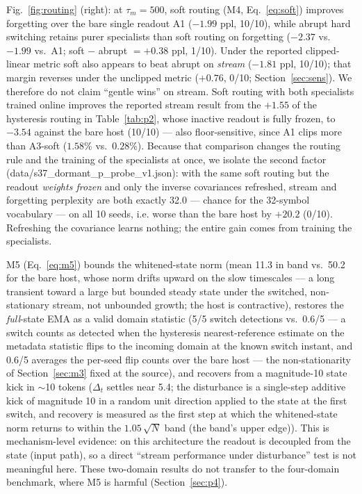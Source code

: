 \documentclass[preprint,12pt]{elsarticle}
\begin{document}
Fig.~\ref{fig:routing} (right): at $\tau_m{=}500$, soft routing (M4,
Eq.~\ref{eq:soft}) improves forgetting over the bare single readout A1
($-1.99$ ppl, 10/10), while abrupt hard switching retains purer
specialists than soft routing on forgetting ($-2.37$ vs.\ $-1.99$ vs.\
A1; soft $-$ abrupt $=+0.38$ ppl, 1/10). Under the reported
clipped-linear metric soft also appears to beat abrupt on
\emph{stream} ($-1.81$ ppl, 10/10); that margin reverses under the
unclipped metric ($+0.76$, 0/10; Section~\ref{sec:sens}). We therefore
do not claim ``gentle wins'' on stream. Soft routing
with both specialists trained online improves the reported stream
result from the $+1.55$ of the hysteresis routing in
Table~\ref{tab:p2}, whose inactive readout is fully frozen, to $-3.54$
against the bare host (10/10) --- also floor-sensitive, since A1 clips
more than A3-soft ($1.58\%$ vs.\ $0.28\%$). Because
that comparison changes the routing rule and the training of the
specialists at once, we isolate the second factor
(data/s37\_dormant\_p\_probe\_v1.json): with the same soft routing but the
readout \emph{weights frozen} and only the inverse covariances refreshed,
stream and forgetting perplexity are both exactly 32.0 --- chance for the
32-symbol vocabulary --- on all 10 seeds, i.e. worse than the bare host by
$+20.2$ (0/10). Refreshing the covariance learns nothing; the entire gain
comes from training the specialists.

M5 (Eq.~\ref{eq:m5}) bounds the whitened-state norm (mean 11.3 in band
vs.\ 50.2 for the bare host, whose norm drifts upward on the slow
timescales --- a long transient toward a large but bounded steady state
under the switched, non-stationary stream, not unbounded growth; the
host is contractive), restores the \emph{full}-state
EMA as a valid domain statistic (5/5 switch detections vs.\ 0.6/5 ---
a switch counts as detected when the hysteresis nearest-reference
estimate on the metadata statistic flips to the incoming domain at the
known switch instant, and 0.6/5 averages the per-seed flip counts over
the bare host --- the
non-stationarity of Section~\ref{sec:m3} fixed at the source), and
recovers from a magnitude-10 state kick in $\sim$10 tokens
($\Delta_t$ settles near 5.4; the disturbance is a single-step
additive kick of magnitude 10 in a random unit direction applied to
the state at the first switch, and recovery is measured as the first
step at which the whitened-state norm returns to within the
$1.05\,\sqrt{N}$ band (the band's upper edge)). This is mechanism-level
evidence: on this
architecture the readout is decoupled from the state (input path), so a
direct ``stream performance under disturbance'' test is not meaningful
here. These two-domain results do not transfer to the four-domain
benchmark, where M5 is harmful (Section~\ref{sec:p4}).
\end{document}
